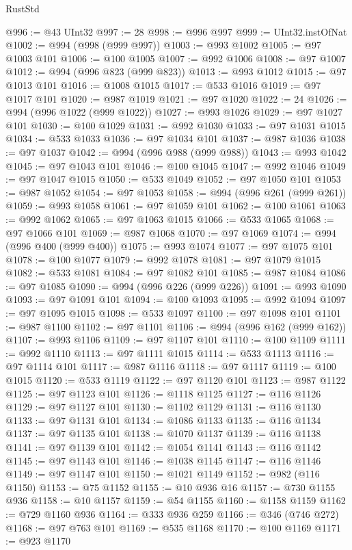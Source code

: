 \begin{lexlean}{RustStd}
\begin{coremodule}
@996 := @43 UInt32
@997 := 28
@998 := @996 @997
@999 := UInt32.instOfNat
@1002 := @994 (@998 (@999 @997))
@1003 := @993 @1002
@1005 := @97 @1003 @101
@1006 := @100 @1005
@1007 := @992 @1006
@1008 := @97 @1007
@1012 := @994 (@996 @823 (@999 @823))
@1013 := @993 @1012
@1015 := @97 @1013 @101
@1016 := @1008 @1015
@1017 := @533 @1016
@1019 := @97 @1017 @101
@1020 := @987 @1019
@1021 := @97 @1020
@1022 := 24
@1026 := @994 (@996 @1022 (@999 @1022))
@1027 := @993 @1026
@1029 := @97 @1027 @101
@1030 := @100 @1029
@1031 := @992 @1030
@1033 := @97 @1031 @1015
@1034 := @533 @1033
@1036 := @97 @1034 @101
@1037 := @987 @1036
@1038 := @97 @1037
@1042 := @994 (@996 @988 (@999 @988))
@1043 := @993 @1042
@1045 := @97 @1043 @101
@1046 := @100 @1045
@1047 := @992 @1046
@1049 := @97 @1047 @1015
@1050 := @533 @1049
@1052 := @97 @1050 @101
@1053 := @987 @1052
@1054 := @97 @1053
@1058 := @994 (@996 @261 (@999 @261))
@1059 := @993 @1058
@1061 := @97 @1059 @101
@1062 := @100 @1061
@1063 := @992 @1062
@1065 := @97 @1063 @1015
@1066 := @533 @1065
@1068 := @97 @1066 @101
@1069 := @987 @1068
@1070 := @97 @1069
@1074 := @994 (@996 @400 (@999 @400))
@1075 := @993 @1074
@1077 := @97 @1075 @101
@1078 := @100 @1077
@1079 := @992 @1078
@1081 := @97 @1079 @1015
@1082 := @533 @1081
@1084 := @97 @1082 @101
@1085 := @987 @1084
@1086 := @97 @1085
@1090 := @994 (@996 @226 (@999 @226))
@1091 := @993 @1090
@1093 := @97 @1091 @101
@1094 := @100 @1093
@1095 := @992 @1094
@1097 := @97 @1095 @1015
@1098 := @533 @1097
@1100 := @97 @1098 @101
@1101 := @987 @1100
@1102 := @97 @1101
@1106 := @994 (@996 @162 (@999 @162))
@1107 := @993 @1106
@1109 := @97 @1107 @101
@1110 := @100 @1109
@1111 := @992 @1110
@1113 := @97 @1111 @1015
@1114 := @533 @1113
@1116 := @97 @1114 @101
@1117 := @987 @1116
@1118 := @97 @1117
@1119 := @100 @1015
@1120 := @533 @1119
@1122 := @97 @1120 @101
@1123 := @987 @1122
@1125 := @97 @1123 @101
@1126 := @1118 @1125
@1127 := @116 @1126
@1129 := @97 @1127 @101
@1130 := @1102 @1129
@1131 := @116 @1130
@1133 := @97 @1131 @101
@1134 := @1086 @1133
@1135 := @116 @1134
@1137 := @97 @1135 @101
@1138 := @1070 @1137
@1139 := @116 @1138
@1141 := @97 @1139 @101
@1142 := @1054 @1141
@1143 := @116 @1142
@1145 := @97 @1143 @101
@1146 := @1038 @1145
@1147 := @116 @1146
@1149 := @97 @1147 @101
@1150 := @1021 @1149
@1152 := @982 (@116 @1150)
@1153 := @75 @1152
@1155 := @10 @936 @16
@1157 := @730 @1155 @936
@1158 := @10 @1157
@1159 := @54 @1155
@1160 := @1158 @1159
@1162 := @729 @1160 @936
@1164 := @333 @936 @259
@1166 := @346 (@746 @272)
@1168 := @97 @763 @101
@1169 := @535 @1168
@1170 := @100 @1169
@1171 := @923 @1170

\end{coremodule}
\end{lexlean}
